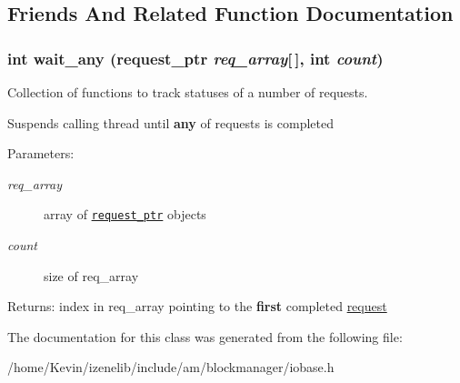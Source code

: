 \subsection{Friends And Related Function Documentation}
\hypertarget{classrequest_7a455713cd840b099075368af3f30ff5}{
\subsubsection[{wait\_\-any}]{\setlength{\rightskip}{0pt plus 5cm}int wait\_\-any ({\bf request\_\-ptr} {\em req\_\-array}\mbox{[}$\,$\mbox{]}, \/  int {\em count})}}
\label{classrequest_7a455713cd840b099075368af3f30ff5}


Collection of functions to track statuses of a number of requests. 

Suspends calling thread until {\bf any} of requests is completed \begin{Desc}
\item[Parameters:]
\begin{description}
\item[{\em req\_\-array}]array of {\tt \hyperlink{classrequest__ptr}{request\_\-ptr}} objects \item[{\em count}]size of req\_\-array \end{description}
\end{Desc}
\begin{Desc}
\item[Returns:]index in req\_\-array pointing to the {\bf first} completed \hyperlink{classrequest}{request} \end{Desc}


The documentation for this class was generated from the following file:\begin{CompactItemize}
\item 
/home/Kevin/izenelib/include/am/blockmanager/iobase.h\end{CompactItemize}
